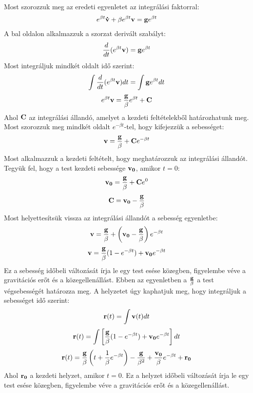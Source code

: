 \documentclass[a4paper,12pt]{article}
\begin{document}
Most szorozzuk meg az eredeti egyenletet az integrálási faktorral:
\begin{equation}
    e^{\beta t}\bold{\dot{v}} + \beta e^{\beta t}\bold{v} = \bold{g}e^{\beta t}
\end{equation}
A bal oldalon alkalmazzuk a szorzat derivált szabályt:
\begin{equation}
    \frac{d}{dt}(e^{\beta t}\bold{v}) = \bold{g}e^{\beta t}
\end{equation}
Most integráljuk mindkét oldalt idő szerint:
\begin{equation}
    \int \frac{d}{dt}(e^{\beta t}\bold{v}) dt = \int \bold{g}e^{\beta t} dt
\end{equation}
\begin{equation}
    e^{\beta t}\bold{v} = \frac{\bold{g}}{\beta}e^{\beta t} + \bold{C}
\end{equation}
Ahol $\bold{C}$ az integrálási állandó, amelyet a kezdeti feltételekből határozhatunk meg. Most szorozzuk meg mindkét oldalt $e^{-\beta t}$-tel, hogy kifejezzük a sebességet:
\begin{equation}
    \bold{v} = \frac{\bold{g}}{\beta} + \bold{C}e^{-\beta t}
\end{equation}
Most alkalmazzuk a kezdeti feltételt, hogy meghatározzuk az integrálási állandót. Tegyük fel, hogy a test kezdeti sebessége $\bold{v_0}$, amikor $t = 0$:
\begin{equation}
    \bold{v_0} = \frac{\bold{g}}{\beta} + \bold{C}e^{0}
\end{equation}
\begin{equation}
    \bold{C} = \bold{v_0} - \frac{\bold{g}}{\beta}
\end{equation}
Most helyettesítsük vissza az integrálási állandót a sebesség egyenletbe:
\begin{equation}
    \bold{v} = \frac{\bold{g}}{\beta} + \left(\bold{v_0} - \frac{\bold{g}}{\beta}\right)e^{-\beta t}
\end{equation}
\begin{equation}
    \bold{v} = \frac{\bold{g}}{\beta}(1 - e^{-\beta t}) + \bold{v_0}e^{-\beta t}
\end{equation}
Ez a sebesség időbeli változását írja le egy test esése közegben, figyelembe véve a gravitációs erőt és a közegellenállást. Ebben az egyenletben a $\frac{\bold{g}}{\beta}$ a test végsebességét határozza meg.
A helyzetet úgy kaphatjuk meg, hogy integráljuk a sebességet idő szerint:
\begin{equation}
    \bold{r}(t) = \int \bold{v}(t) dt
\end{equation}
\begin{equation}
    \bold{r}(t) = \int \left[\frac{\bold{g}}{\beta}(1 - e^{-\beta t}) + \bold{v_0}e^{-\beta t}\right] dt
\end{equation}
\begin{equation}
    \bold{r}(t) = \frac{\bold{g}}{\beta}\left(t + \frac{1}{\beta}e^{-\beta t}\right) - \frac{\bold{g}}{\beta^2} + \frac{\bold{v_0}}{\beta}e^{-\beta t} + \bold{r_0} 
\end{equation}
Ahol $\bold{r_0}$ a kezdeti helyzet, amikor $t = 0$. Ez a helyzet időbeli változását írja le egy test esése közegben, figyelembe véve a gravitációs erőt és a közegellenállást.
\end{document}
